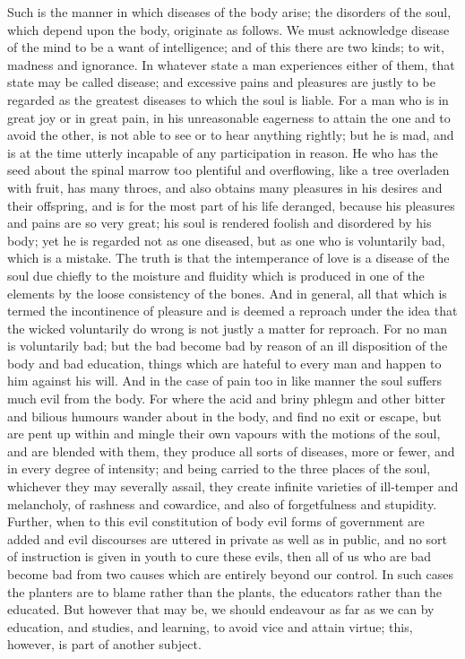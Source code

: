 Such is the manner in which diseases of the body arise; the disorders of
the soul, which depend upon the body, originate as follows. We must
acknowledge disease of the mind to be a want of intelligence; and of this
there are two kinds; to wit, madness and ignorance. In whatever state a
man experiences either of them, that state may be called disease; and
excessive pains and pleasures are justly to be regarded as the greatest
diseases to which the soul is liable. For a man who is in great joy or in
great pain, in his unreasonable eagerness to attain the one and to avoid
the other, is not able to see or to hear anything rightly; but he is mad,
and is at the time utterly incapable of any participation in reason. He
who has the seed about the spinal marrow too plentiful and overflowing,
like a tree overladen with fruit, has many throes, and also obtains many
pleasures in his desires and their offspring, and is for the most part of
his life deranged, because his pleasures and pains are so very great; his
soul is rendered foolish and disordered by his body; yet he is regarded
not as one diseased, but as one who is voluntarily bad, which is a
mistake. The truth is that the intemperance of love is a disease of the
soul due chiefly to the moisture and fluidity which is produced in one of
the elements by the loose consistency of the bones. And in general, all
that which is termed the incontinence of pleasure and is deemed a reproach
under the idea that the wicked voluntarily do wrong is not justly a matter
for reproach. For no man is voluntarily bad; but the bad become bad by
reason of an ill disposition of the body and bad education, things which
are hateful to every man and happen to him against his will. And in the
case of pain too in like manner the soul suffers much evil from the body.
For where the acid and briny phlegm and other bitter and bilious humours
wander about in the body, and find no exit or escape, but are pent up
within and mingle their own vapours with the motions of the soul, and are
blended with them, they produce all sorts of diseases, more or fewer, and
in every degree of intensity; and being carried to the three places of the
soul, whichever they may severally assail, they create infinite varieties
of ill-temper and melancholy, of rashness and cowardice, and also of
forgetfulness and stupidity. Further, when to this evil constitution of
body evil forms of government are added and evil discourses are uttered in
private as well as in public, and no sort of instruction is given in youth
to cure these evils, then all of us who are bad become bad from two causes
which are entirely beyond our control. In such cases the planters are to
blame rather than the plants, the educators rather than the educated. But
however that may be, we should endeavour as far as we can by education,
and studies, and learning, to avoid vice and attain virtue; this, however,
is part of another subject.

